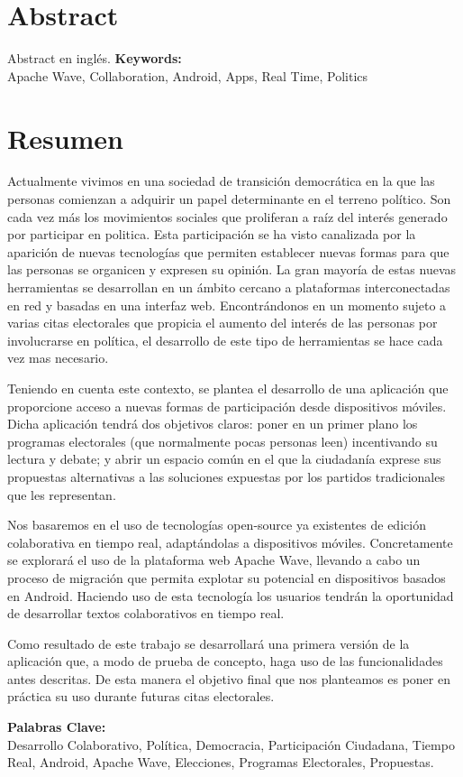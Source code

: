 \newpage
\renewcommand{\thepage}{\Roman{page}}
\setcounter{page}{9}
\chapter*{Abstract}
Abstract en inglés.
\vfill
{\large \bf Keywords:}\\
{\large Apache Wave, Collaboration, Android, Apps, Real Time, Politics}

\newpage
\renewcommand{\thepage}{\Roman{page}}
\setcounter{page}{10}
\chapter*{Resumen}
Actualmente vivimos en una sociedad de transición democrática en la que las personas comienzan a adquirir un papel determinante en el terreno político. Son cada vez más los movimientos sociales que proliferan a raíz del interés generado por participar en politica. Esta participación se ha visto canalizada por la aparición de nuevas tecnologías que permiten establecer nuevas formas para que las personas se organicen y expresen su opinión. La gran mayoría de estas nuevas herramientas se desarrollan en un ámbito cercano a plataformas interconectadas en red y basadas en una interfaz web. Encontrándonos en un momento sujeto a varias citas electorales que propicia el aumento del interés de las personas por involucrarse en política, el desarrollo de este tipo de herramientas se hace cada vez mas necesario.

Teniendo en cuenta este contexto, se plantea el desarrollo de una aplicación que proporcione acceso a nuevas formas de participación desde dispositivos móviles. Dicha aplicación tendrá dos objetivos claros: poner en un primer plano los programas electorales (que normalmente pocas personas leen) incentivando su lectura y debate; y abrir un espacio común en el que la ciudadanía exprese sus propuestas alternativas a las soluciones expuestas por los partidos tradicionales que les representan.

Nos basaremos en el uso de tecnologías open-source ya existentes de edición colaborativa en tiempo real, adaptándolas a dispositivos móviles. Concretamente se explorará el uso de la plataforma web Apache Wave, llevando a cabo un proceso de migración que permita explotar su potencial en dispositivos basados en Android. Haciendo uso de esta tecnología los usuarios tendrán la oportunidad de desarrollar textos colaborativos en tiempo real.

Como resultado de este trabajo se desarrollará una primera versión de la aplicación que, a modo de prueba de concepto, haga uso de las funcionalidades antes descritas. De esta manera el objetivo final que nos planteamos es poner en práctica su uso durante futuras citas electorales.

\vfill
{\bf Palabras Clave:}\\
{Desarrollo Colaborativo, Política, Democracia, Participación Ciudadana, Tiempo Real, Android, Apache Wave, Elecciones, Programas Electorales, Propuestas.}

\newpage
\thispagestyle{empty}
\mbox{}

